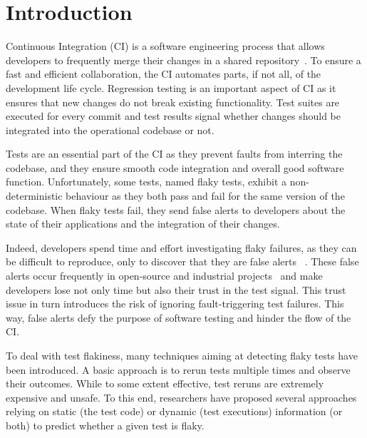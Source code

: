\section{Introduction}
\label{sec:chromium-introduction}


Continuous Integration (CI) is a software engineering process that allows developers to frequently merge their changes in a shared repository~\cite{CI}. To ensure a fast and efficient collaboration, the CI automates parts, if not all, of the development life cycle. Regression testing is an important aspect of CI as it ensures that new changes do not break existing functionality. Test suites are executed for every commit and test results signal whether changes should be integrated into the operational codebase or not.

Tests are an essential part of the CI as they prevent faults from interring the codebase, and they ensure smooth code integration and overall good software function. Unfortunately, some tests, named flaky tests, exhibit a non-deterministic behaviour as they both pass and fail for the same version of the codebase. When flaky tests fail, they send false alerts to developers about the state of their applications and the integration of their changes. 

Indeed, developers spend time and effort investigating flaky failures, as they can be difficult to reproduce, only to discover that they are false alerts ~\cite{Eck2019}. These false alerts occur frequently in open-source and industrial projects~\cite{Bell2018,Kowalczyk2020,Lam2019iDFlakies,LeongSPTM19} and make developers lose not only time but also their trust in the test signal. This trust issue in turn introduces the risk of ignoring fault-triggering test failures. This way, false alerts defy the purpose of software testing and hinder the flow of the CI.

To deal with test flakiness, many techniques aiming at detecting flaky tests have been introduced. A basic approach is to rerun tests multiple times and observe their outcomes. While to some extent effective, test reruns are extremely expensive \cite{LeongSPTM19,Bell2018} and unsafe. To this end, researchers have proposed several approaches relying on static (the test code) \cite{camara2021use,Pinto2020,fatima2021flakify,King2018, LeongSPTM19} or dynamic (test executions) \cite{Bell2018,Lam2019iDFlakies,ziftci2020flake} information (or both) \cite{alshammari2021flakeflagger} to predict whether a given test is flaky. 

